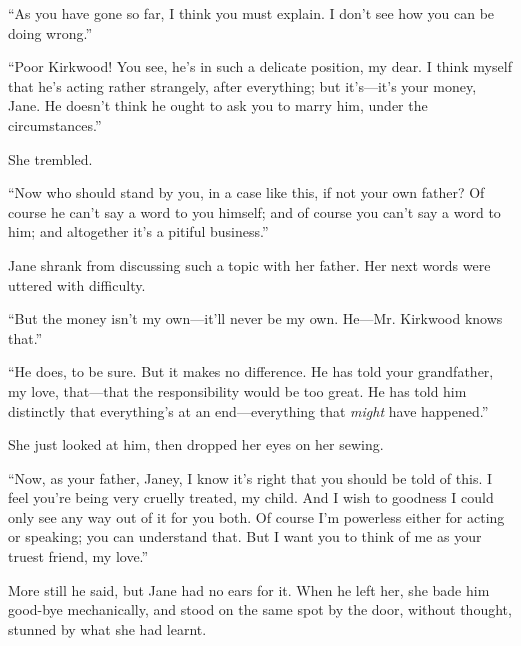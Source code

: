``As you have gone so far, I think you must explain. I don't see how you
can be doing wrong.''

{}``Poor Kirkwood! You see, he's in such a delicate position, my dear. I
think myself that he's acting rather strangely, after everything; but
it's---it's your money, Jane. He doesn't think he ought to ask you to
marry him, under the circumstances.''

She trembled.

``Now who should stand by you, in a case like this, if not your own
father? Of course he can't say a word to you himself; and of course you
can't say a word to him; and altogether it's a pitiful business.''

Jane shrank from discussing such a topic with her father. Her next words
were uttered with difficulty.

``But the money isn't my own---it'll never be my own. He---Mr. Kirkwood
knows that.''

``He does, to be sure. But it makes no difference. He has told your
grandfather, my love, that---that the responsibility would be too great.
He has told him distinctly that everything's at an end---everything that
\emph{might} have happened.''

She just looked at him, then dropped her eyes on her sewing.

``Now, as your father, Janey, I know it's {}right that you should be
told of this. I feel you're being very cruelly treated, my child. And I
wish to goodness I could only see any way out of it for you both. Of
course I'm powerless either for acting or speaking; you can understand
that. But I want you to think of me as your truest friend, my love.''

More still he said, but Jane had no ears for it. When he left her, she
bade him good-bye mechanically, and stood on the same spot by the door,
without thought, stunned by what she had learnt.

